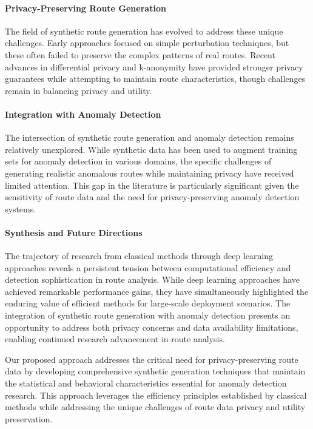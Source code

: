 \documentclass[runningheads]{llncs}
\begin{document}
\paragraph{Privacy-Preserving Route Generation}
The field of synthetic route generation has evolved to address these unique challenges. Early approaches focused on simple perturbation techniques, but these often failed to preserve the complex patterns of real routes. Recent advances in differential privacy and k-anonymity have provided stronger privacy guarantees while attempting to maintain route characteristics, though challenges remain in balancing privacy and utility.

\paragraph{Integration with Anomaly Detection}
The intersection of synthetic route generation and anomaly detection remains relatively unexplored. While synthetic data has been used to augment training sets for anomaly detection in various domains, the specific challenges of generating realistic anomalous routes while maintaining privacy have received limited attention. This gap in the literature is particularly significant given the sensitivity of route data and the need for privacy-preserving anomaly detection systems.

\paragraph{Synthesis and Future Directions}
The trajectory of research from classical methods through deep learning approaches reveals a persistent tension between computational efficiency and detection sophistication in route analysis. While deep learning approaches have achieved remarkable performance gains, they have simultaneously highlighted the enduring value of efficient methods for large-scale deployment scenarios. The integration of synthetic route generation with anomaly detection presents an opportunity to address both privacy concerns and data availability limitations, enabling continued research advancement in route analysis.

Our proposed approach addresses the critical need for privacy-preserving route data by developing comprehensive synthetic generation techniques that maintain the statistical and behavioral characteristics essential for anomaly detection research. This approach leverages the efficiency principles established by classical methods while addressing the unique challenges of route data privacy and utility preservation.
\end{document}
